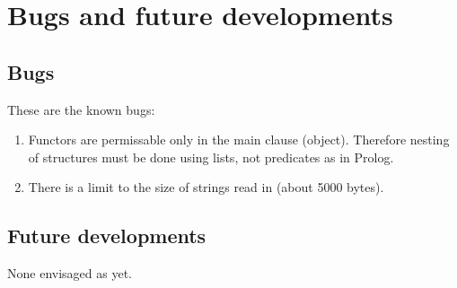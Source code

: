 \chapter{Bugs and future developments}
%
\setfooter{\thepage}{}{}{}{}{\thepage}

\section{Bugs}

These are the known bugs:

\begin{enumerate}
\item Functors are permissable only in the main clause (object).
Therefore nesting of structures must be done using lists, not predicates
as in Prolog.
\item There is a limit to the size of strings read in (about 5000 bytes).
\end{enumerate}

\section{Future developments}

None envisaged as yet.



%
\printindex


